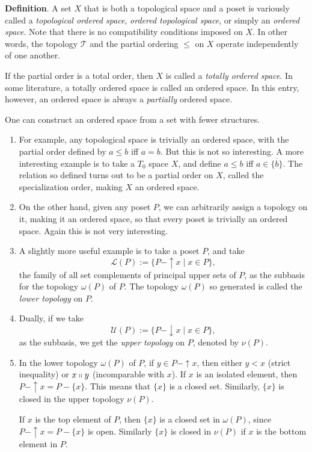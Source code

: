 \documentclass[12pt]{article}
\newcommand{\up}{\uparrow\!\!}
\newcommand{\down}{\downarrow\!\!}
\begin{document}
\textbf{Definition}.  A set $X$ that is both a topological space and a poset is variously called a \emph{topological ordered space}, \emph{ordered topological space}, or simply an \emph{ordered space}.  Note that there is no compatibility conditions imposed on $X$.  In other words, the topology $\mathcal{T}$ and the partial ordering $\le$ on $X$ operate independently of one another.  

If the partial order is a total order, then $X$ is called a \emph{totally ordered space}.  In some literature, a totally ordered space is called an ordered space.  In this entry, however, an ordered space is always a \emph{partially} ordered space.

One can construct an ordered space from a set with fewer structures.
\begin{enumerate}
\item
For example, any topological space is trivially an ordered space, with the partial order defined by $a\le b$ iff $a=b$.  But this is not so interesting.  A more interesting example is to take a $T_0$ space $X$, and define $a\le b$ iff $a\in \overline{\lbrace b\rbrace}$.  The relation so defined turns out to be a partial order on $X$, called the specialization order, making $X$ an ordered space.
\item
On the other hand, given any poset $P$, we can arbitrarily assign a topology on it, making it an ordered space, so that every poset is trivially an ordered space.  Again this is not very interesting.  
\item
A slightly more useful example is to take a poset $P$, and take $$\mathcal{L}(P):=\lbrace P-\up x\mid x\in P\rbrace,$$ the family of all set complements of principal upper sets of $P$, as the subbasis for the topology $\omega(P)$ of $P$.  The topology $\omega(P)$ so generated is called the \emph{lower topology} on $P$.  
\item
Dually, if we take $$\mathcal{U}(P):=\lbrace P-\down x\mid x\in P\rbrace,$$ as the subbasis, we get the \emph{upper topology} on $P$, denoted by $\nu(P)$.  
\item
In the lower topology $\omega(P)$ of $P$, if $y\in P-\up x$, then either $y< x$ (strict inequality) or $x\shortparallel y$ (incomparable with $x$).  If $x$ is an isolated element, then $P-\up x=P-\lbrace x\rbrace$.  This means that $\lbrace x\rbrace$ is a closed set.  Similarly, $\lbrace x\rbrace$ is closed in the upper topology $\nu(P)$.  

If $x$ is the top element of $P$, then $\lbrace x\rbrace$ is a closed set in $\omega(P)$, since $P-\up x=P-\lbrace x\rbrace$ is open.  Similarly $\lbrace x\rbrace$ is closed in $\nu(P)$ if $x$ is the bottom element in $P$.


\end{enumerate}
\end{document}
